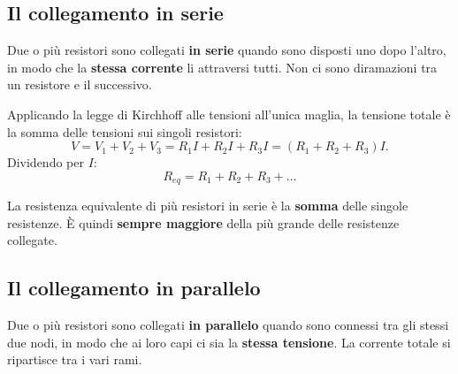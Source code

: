 \subsection{Il collegamento in serie}

\begin{concetto}
Due o più resistori sono collegati \textbf{in serie} quando sono disposti uno dopo l'altro, in modo che la \textbf{stessa corrente} li attraversi tutti. Non ci sono diramazioni tra un resistore e il successivo.
\end{concetto}

\begin{center}
\end{center}

Applicando la legge di Kirchhoff alle tensioni all'unica maglia, la tensione totale è la somma delle tensioni sui singoli resistori:
\[
V = V_1 + V_2 + V_3 = R_1 I + R_2 I + R_3 I = (R_1 + R_2 + R_3) I.
\]
Dividendo per \(I\):
\[
\boxed{
R_{eq} = R_1 + R_2 + R_3 + \dots
}
\]

\begin{concetto}
La resistenza equivalente di più resistori in serie è la \textbf{somma} delle singole resistenze. È quindi \textbf{sempre maggiore} della più grande delle resistenze collegate.
\end{concetto}

\subsection{Il collegamento in parallelo}

\begin{concetto}
Due o più resistori sono collegati \textbf{in parallelo} quando sono connessi tra gli stessi due nodi, in modo che ai loro capi ci sia la \textbf{stessa tensione}. La corrente totale si ripartisce tra i vari rami.
\end{concetto}

